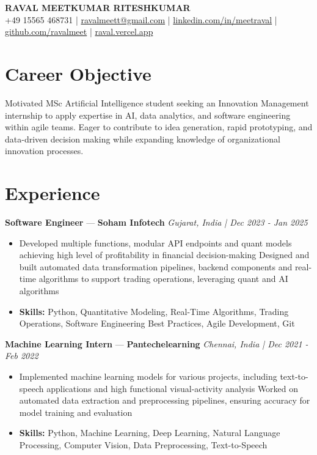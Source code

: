 \documentclass[a4paper,10pt]{article}
\begin{document}
\begin{center}
  {\Large\bfseries RAVAL MEETKUMAR RITESHKUMAR}\\[2pt]
  {\small +49 15565 468731 \;|\; \href{mailto:ravalmeett@gmail.com}{ravalmeett@gmail.com} \;|\; \href{https://www.linkedin.com/in/meetraval/}{linkedin.com/in/meetraval} \;|\; \href{https://github.com/ravalmeet}{github.com/ravalmeet} \;|\; \href{https://raval.vercel.app/}{raval.vercel.app}}
\end{center}
\vspace{-3pt}

\section*{Career Objective}
Motivated MSc Artificial Intelligence student seeking an Innovation Management internship to apply expertise in AI, data analytics, and software engineering within agile teams. Eager to contribute to idea generation, rapid prototyping, and data-driven decision making while expanding knowledge of organizational innovation processes.\par

\section*{Experience}
\textbf{Software Engineer} — \textbf{Soham Infotech} \hfill \textit{Gujarat, India \;|\; Dec 2023 - Jan 2025}\par
\vspace{1pt}
\begin{itemize}
  \item Developed multiple functions, modular API endpoints and quant models achieving high level of profitability in financial decision-making Designed and built automated data transformation pipelines, backend components and real-time algorithms to support trading operations, leveraging quant and AI algorithms
  \item \textbf{Skills:} Python, Quantitative Modeling, Real-Time Algorithms, Trading Operations, Software Engineering Best Practices, Agile Development, Git
\end{itemize}
\vspace{3pt}
\textbf{Machine Learning Intern} — \textbf{Pantechelearning} \hfill \textit{Chennai, India \;|\; Dec 2021 - Feb 2022}\par
\vspace{1pt}
\begin{itemize}
  \item Implemented machine learning models for various projects, including text-to-speech applications and high functional visual-activity analysis Worked on automated data extraction and preprocessing pipelines, ensuring accuracy for model training and evaluation
  \item \textbf{Skills:} Python, Machine Learning, Deep Learning, Natural Language Processing, Computer Vision, Data Preprocessing, Text-to-Speech
\end{itemize}
\end{document}
